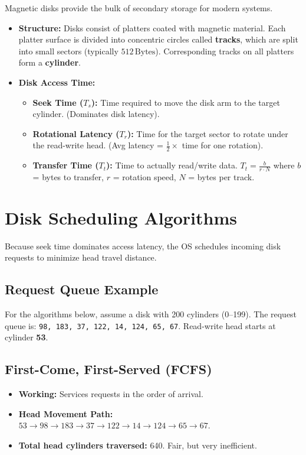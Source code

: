 \documentclass[12pt,a4paper]{article}
\begin{document}
Magnetic disks provide the bulk of secondary storage for modern systems.
\begin{itemize}[leftmargin=*, itemsep=3pt]
  \item \textbf{Structure:} Disks consist of platters coated with magnetic material. Each platter surface is divided into concentric circles called \textbf{tracks}, which are split into small sectors (typically $512\,\text{Bytes}$). Corresponding tracks on all platters form a \textbf{cylinder}.
  \item \textbf{Disk Access Time:}
  \begin{itemize}[leftmargin=*, itemsep=2.5pt, topsep=0pt]
    \item \textbf{Seek Time ($T_s$):} Time required to move the disk arm to the target cylinder. (Dominates disk latency).
    \item \textbf{Rotational Latency ($T_r$):} Time for the target sector to rotate under the read-write head. (Avg latency = $\frac{1}{2} \times$ time for one rotation).
    \item \textbf{Transfer Time ($T_t$):} Time to actually read/write data. $T_t = \frac{b}{r \cdot N}$ where $b$ = bytes to transfer, $r$ = rotation speed, $N$ = bytes per track.
    \end{itemize}
  \end{itemize}

\section{Disk Scheduling Algorithms}

Because seek time dominates access latency, the OS schedules incoming disk requests to minimize head travel distance.

\subsection*{Request Queue Example}
For the algorithms below, assume a disk with 200 cylinders (0–199). The request queue is:
\texttt{98, 183, 37, 122, 14, 124, 65, 67}. Read-write head starts at cylinder \textbf{53}.

\subsection{First-Come, First-Served (FCFS)}
\begin{itemize}[leftmargin=*, itemsep=3pt]
  \item \textbf{Working:} Services requests in the order of arrival.
  \item \textbf{Head Movement Path:} $53 \to 98 \to 183 \to 37 \to 122 \to 14 \to 124 \to 65 \to 67$.
  \item \textbf{Total head cylinders traversed:} 640. Fair, but very inefficient.
\end{itemize}
\end{document}
